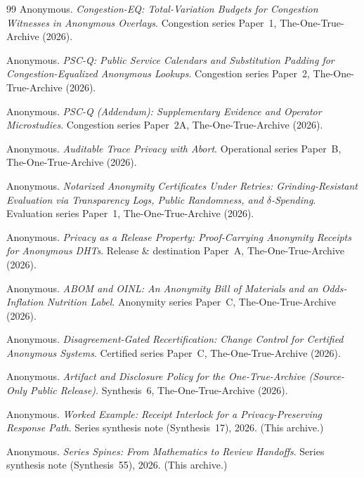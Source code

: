 \documentclass[11pt]{article}
\begin{document}
\begin{thebibliography}{99}\small
{}
Anonymous.
\newblock \emph{Congestion-EQ: Total-Variation Budgets for Congestion Witnesses in Anonymous Overlays}.
\newblock Congestion series Paper~1, The-One-True-Archive (2026).

Anonymous.
\newblock \emph{PSC-Q: Public Service Calendars and Substitution Padding for Congestion-Equalized Anonymous Lookups}.
\newblock Congestion series Paper~2, The-One-True-Archive (2026).

Anonymous.
\newblock \emph{PSC-Q (Addendum): Supplementary Evidence and Operator Microstudies}.
\newblock Congestion series Paper~2A, The-One-True-Archive (2026).

Anonymous.
\newblock \emph{Auditable Trace Privacy with Abort}.
\newblock Operational series Paper~B, The-One-True-Archive (2026).

Anonymous.
\newblock \emph{Notarized Anonymity Certificates Under Retries: Grinding-Resistant Evaluation via Transparency Logs, Public Randomness, and $\delta$-Spending}.
\newblock Evaluation series Paper~1, The-One-True-Archive (2026).

Anonymous.
\newblock \emph{Privacy as a Release Property: Proof-Carrying Anonymity Receipts for Anonymous DHTs}.
\newblock Release \& destination Paper~A, The-One-True-Archive (2026).

Anonymous.
\newblock \emph{ABOM and OINL: An Anonymity Bill of Materials and an Odds-Inflation Nutrition Label}.
\newblock Anonymity series Paper~C, The-One-True-Archive (2026).

Anonymous.
\newblock \emph{Disagreement-Gated Recertification: Change Control for Certified Anonymous Systems}.
\newblock Certified series Paper~C, The-One-True-Archive (2026).

Anonymous.
\newblock \emph{Artifact and Disclosure Policy for the One-True-Archive (Source-Only Public Release)}.
\newblock Synthesis~6, The-One-True-Archive (2026).

Anonymous.
\newblock \emph{Worked Example: Receipt Interlock for a Privacy-Preserving Response Path}.
\newblock Series synthesis note (Synthesis~17), 2026. (This archive.)

Anonymous.
\newblock \emph{Series Spines: From Mathematics to Review Handoffs}.
\newblock Series synthesis note (Synthesis~55), 2026. (This archive.)


\end{thebibliography}
\end{document}
